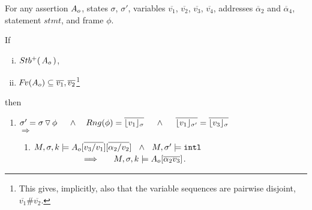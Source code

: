 \begin{lemma}
\label{l:calls}

For any assertion $A_{o}$, states $\sigma$, $\sigma'$,  
variables  $\overline{v_1}$,    $\overline{v_2}$,  $\overline{v_3}$,  $\overline{v_4}$,  addresses $\overline \alpha_2$ and $\overline \alpha_4$, 
statement $stmt$, and frame $\phi$.

\noindent
If 
\begin{enumerate}[(i)]
\item 
\label{l:calls:r:one}
$ {Stb^+(\, A_{o}\, )}$,  
\item 
\label{l:calls:r:two}
${\hspace{-1pt}F\hspace{-1pt}}v(A_{o}) \subseteq  \overline{v_1}, \overline{v_2} $\footnote{This gives, implicitly, also that the variable sequences  are pairwise disjoint, \ie $\overline{v_1}\#\overline{v_2}$.}
\end{enumerate}
 then 
\begin{enumerate}

\item
\label{l:calls:callee}
$\sigma'=\sigma  \pushSymbol \phi  \ \ \ \  \wedge\ \ \  Rng(\phi)= \overline{\interpret {\sigma} {v_1} }\ \ \ \ \wedge \ \  \ \ \overline {\interpret {\sigma'}  {v_1} } = \overline {\interpret {\sigma} {v_3} }$ 
\\ 
$\Longrightarrow$

\begin{enumerate}
\item
\label{l:calls:callee:one}
$M,\sigma ,{k} \models {A_{o}} [\overline {v_3/v_1}] [\overline {\alpha_2/v_2}] \ \    \wedge\ \ M, \sigma' \models \mbox{\normalfont{\texttt{intl}}}  $
 \\ 
$\strut \hspace{2cm}  \hfill \Longrightarrow  \ \ \  \   \ \satDAssertFrom M  {\sigma} k  {\Ao[\overline { \alpha_2v_3}]}$.




\end{enumerate}
\end{enumerate}
\end{lemma}
